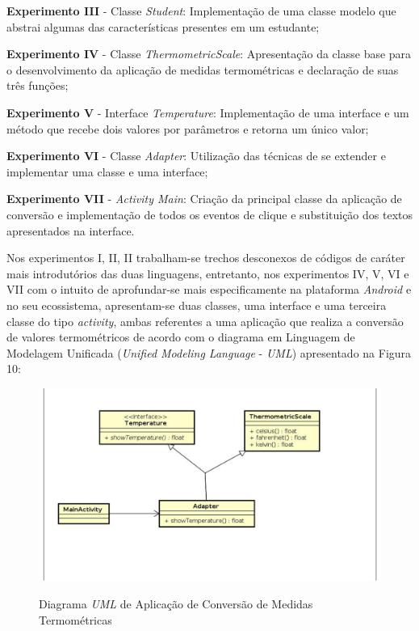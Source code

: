 \textbf{Experimento III} - Classe \textit{Student}: Implementação de uma classe modelo que abstrai algumas das características presentes em um estudante;

\textbf{Experimento IV} - Classe \textit{ThermometricScale}: Apresentação da classe base para o desenvolvimento da aplicação de medidas termométricas e declaração de suas três funções;

\textbf{Experimento V} - Interface \textit{Temperature}: Implementação de uma interface e um método que recebe dois valores por parâmetros e retorna um único valor;

\textbf{Experimento VI} - Classe \textit{Adapter}:
Utilização das técnicas de se extender e implementar uma classe e uma interface;

\textbf{Experimento VII} - \textit{Activity Main}: Criação da principal classe da aplicação de conversão e implementação de todos os eventos de clique e substituição dos textos apresentados na interface.

Nos experimentos I, II, II trabalham-se trechos desconexos de códigos de caráter mais introdutórios das duas linguagens, entretanto, nos experimentos IV, V, VI e VII com o intuito de aprofundar-se mais especificamente na plataforma \textit{Android} e no seu ecossistema, apresentam-se duas classes, uma interface e uma terceira classe do tipo \textit{activity}, ambas referentes a uma aplicação que realiza a conversão de valores termométricos de acordo com o diagrama em Linguagem de Modelagem Unificada (\textit{Unified Modeling Language} - \textit{UML}) apresentado na Figura 10:

\FloatBarrier
\begin{figure}[!htbp]
	\centering
		\caption{Diagrama \textit{UML} de Aplicação de Conversão de Medidas Termométricas}
	\includegraphics[scale=1]{imagens/umlTCC}
	\label{fig:figura3}
\end{figure}
\FloatBarrier

